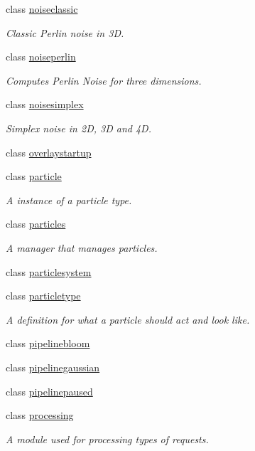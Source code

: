 \begin{DoxyCompactItemize}
class \hyperlink{classflounder_1_1noiseclassic}{noiseclassic}
\begin{DoxyCompactList}\small\item\em Classic Perlin noise in 3D. \end{DoxyCompactList}\item 
class \hyperlink{classflounder_1_1noiseperlin}{noiseperlin}
\begin{DoxyCompactList}\small\item\em Computes Perlin Noise for three dimensions. \end{DoxyCompactList}\item 
class \hyperlink{classflounder_1_1noisesimplex}{noisesimplex}
\begin{DoxyCompactList}\small\item\em Simplex noise in 2D, 3D and 4D. \end{DoxyCompactList}\item 
class \hyperlink{classflounder_1_1overlaystartup}{overlaystartup}
\item 
class \hyperlink{classflounder_1_1particle}{particle}
\begin{DoxyCompactList}\small\item\em A instance of a particle type. \end{DoxyCompactList}\item 
class \hyperlink{classflounder_1_1particles}{particles}
\begin{DoxyCompactList}\small\item\em A manager that manages particles. \end{DoxyCompactList}\item 
class \hyperlink{classflounder_1_1particlesystem}{particlesystem}
\item 
class \hyperlink{classflounder_1_1particletype}{particletype}
\begin{DoxyCompactList}\small\item\em A definition for what a particle should act and look like. \end{DoxyCompactList}\item 
class \hyperlink{classflounder_1_1pipelinebloom}{pipelinebloom}
\item 
class \hyperlink{classflounder_1_1pipelinegaussian}{pipelinegaussian}
\item 
class \hyperlink{classflounder_1_1pipelinepaused}{pipelinepaused}
\item 
class \hyperlink{classflounder_1_1processing}{processing}
\begin{DoxyCompactList}\small\item\em A module used for processing types of requests. \end{DoxyCompactList}\item 

\end{DoxyCompactItemize}
